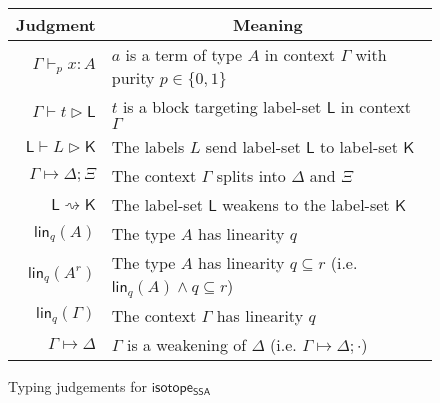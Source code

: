\documentclass[acmsmall,screen,review]{acmart}
\newcommand{\ms}[1]{\ensuremath{\mathsf{#1}}}
\newcommand{\csplits}[3]{#1 \mapsto #2;#3}
\newcommand{\cwk}[2]{#1 \mapsto #2}
\newcommand{\lwk}[2]{#1 \rightsquigarrow #2}
\newcommand{\tlin}[2]{\ms{lin}_{#2}(#1)}
\newcommand{\ltlin}[3]{\ms{lin}_{#3}(#1^{#2})}
\newcommand{\hasty}[4]{#1 \vdash_{#2} #3: #4}
\newcommand{\haslb}[3]{#1 \vdash #2 \rhd #3}
\newcommand{\lhaslb}[3]{#1 \vdash #2 \rhd #3}
\newcommand{\isotopessa}{\ms{isotope_{SSA}}}
\begin{document}
\begin{figure}
  \begin{center}        
    \begingroup
    \renewcommand{\arraystretch}{1.5}
    \setlength{\tabcolsep}{2em}
    \begin{tabular}{rl}
        \multicolumn{1}{c}{Judgment} & \multicolumn{1}{c}{Meaning} \\ \hline
        \(\hasty{\Gamma}{p}{x}{A}\) &
        \(a\) is a term of type \(A\) in context \(\Gamma\) with purity \(p \in \{0, 1\}\) \\
        \(\haslb{\Gamma}{t}{\ms{L}}\) &
        \(t\) is a block targeting label-set \(\ms{L}\) in context \(\Gamma\) \\
        \(\lhaslb{\ms{L}}{L}{\ms{K}}\) &
        The labels \(L\) send label-set \(\ms{L}\) to label-set \(\ms{K}\) \\
        \(\csplits{\Gamma}{\Delta}{\Xi}\) &
        The context \(\Gamma\) splits into \(\Delta\) and \(\Xi\) \\
        \(\lwk{\ms{L}}{\ms{K}}\) &
        The label-set \(\ms{L}\) weakens to the label-set \(\ms{K}\) \\
        \(\tlin{A}{q}\) &
        The type \(A\) has linearity \(q\) \\
        \(\ltlin{A}{r}{q}\) &
        The type \(A\) has linearity \(q \subseteq r\)
        (i.e. \(\tlin{A}{q} \land q \subseteq r\)) \\
        \(\tlin{\Gamma}{q}\) &
        The context \(\Gamma\) has linearity \(q\) \\
        \(\cwk{\Gamma}{\Delta}\) &
        \(\Gamma\) is a weakening of \(\Delta\) 
        (i.e. \(\csplits{\Gamma}{\Delta}{\cdot}\))
    \end{tabular}
    \endgroup
  \end{center}
  \caption{Typing judgements for \isotopessa}
  \label{fig:ssa-judgements}
\end{figure}
\end{document}
